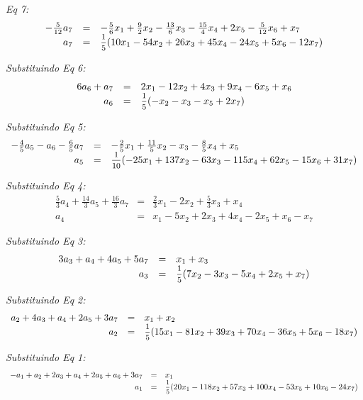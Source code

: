 \documentclass[11pt]{article}
\newenvironment{question}[1]
  {\par\addvspace{\medskipamount}
   \noindent\makebox[0pt][r]{\textbf{#1)} }\ignorespaces}
  {\par\addvspace{\medskipamount}}
\begin{document}
\begin{question}{4}
\bigskip
\textit{Eq 7:}
$$
\begin{array}{rcl}
    -\frac{5}{12}a_7 &= &-\frac{5}{6}x_1 + \frac{9}{2}x_2 - \frac{13}{6}x_3 - \frac{15}{4}x_4 + 2 x_5 - \frac{5}{12}x_6 + x_7\\
    a_7 &= &\mfrac{1}{5}(10x_1-54x_2+26x_3+45x_4-24x_5+5x_6-12x_7)
\end{array}
$$

\bigskip
\textit{Substituindo Eq 6:}
$$
\begin{array}{rcl}
    6a_6 + a_7 &= &2 x_1 - 12 x_2 + 4 x_3 + 9 x_4 - 6 x_5 + x_6\\
    a_6 &= &\mfrac{1}{5}(-x_2-x_3-x_5+2x_7)
\end{array}
$$

\bigskip
\textit{Substituindo Eq 5:}
$$
\begin{array}{rcl}
    -\frac{4}{5}a_5 - a_6 - \frac{6}{5}a_7 &= &-\frac{2}{5}x_1 + \frac{11}{5}x_2 - x_3 - \frac{8}{5}x_4 + x_5\\
    a_5 &= &\mfrac{1}{10}(-25x_1+137x_2-63x_3-115x_4+62x_5-15x_6+31x_7)
\end{array}
$$

\bigskip
\textit{Substituindo Eq 4:}
$$
\begin{array}{rcl}
    \frac{5}{3}a_4 + \frac{14}{3}a_5 + \frac{16}{3}a_7 &= &\frac{2}{3}x_1 - 2 x_2 + \frac{5}{3}x_3 + x_4\\
    a_4 &= &x_1-5x_2+2x_3+4x_4-2x_5+x_6-x_7
\end{array}
$$

\bigskip
\textit{Substituindo Eq 3:}
$$
\begin{array}{rcl}
    3a_3 + a_4 + 4a_5 + 5a_7 &= &x_1 + x_3\\
    a_3 &= &\mfrac{1}{5}(7x_2-3x_3-5x_4+2x_5+x_7)
\end{array}
$$

\bigskip
\textit{Substituindo Eq 2:}
$$
\begin{array}{rcl}
    a_2 + 4a_3 + a_4 + 2a_5 + 3a_7 &= &x_1 + x_2\\
    a_2 &= &\mfrac{1}{5}(15x_1-81x_2+39x_3+70x_4-36x_5+5x_6-18x_7)
\end{array}
$$

\bigskip
\textit{Substituindo Eq 1:}
$$
\begin{array}{rcl}
    -a_1 + a_2 + 2a_3 + a_4 + 2a_5 + a_6 + 3a_7 &= &x_1\\
    a_1 &= &\mfrac{1}{5}(20x_1-118x_2+57x_3+100x_4-53x_5+10x_6-24x_7)
\end{array}
$$

\end{question}
\end{document}
